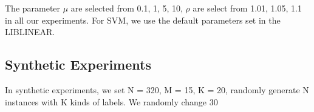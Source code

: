\documentclass[letterpaper]{article}
\begin{document}
The parameter $\mu$ are selected from {0.1, 1, 5, 10}, $\rho$ are select from {1.01, 1.05, 1.1} in all our experiments. For SVM, we use the default parameters set in the LIBLINEAR.

\subsection{Synthetic Experiments}

In synthetic experiments, we set N = 320, M = 15, K = 20, randomly generate N instances with K kinds of labels. We randomly change 30%
\end{document}
